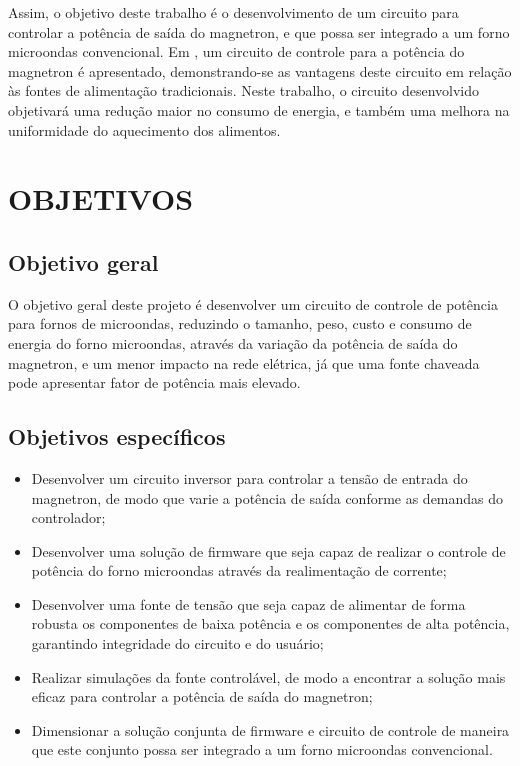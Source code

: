  Assim, o objetivo deste trabalho é o desenvolvimento de um circuito para controlar a potência de saída do magnetron, e que possa ser integrado a um forno microondas convencional. Em \cite{Hidenori1991}, um circuito de controle para a potência do magnetron é apresentado, demonstrando-se as vantagens deste circuito em relação às fontes de alimentação tradicionais. Neste trabalho, o circuito desenvolvido objetivará uma redução maior no consumo de energia, e também uma melhora na uniformidade do aquecimento dos alimentos.


\section{OBJETIVOS}
\label{sec:objetivos}


\subsection{Objetivo geral}
\label{sec:objetivosGerais}

O objetivo geral deste projeto é desenvolver um circuito de controle de potência para fornos de microondas, reduzindo o tamanho, peso, custo e consumo de energia do forno microondas, através da variação da potência de saída do magnetron, e um menor impacto na rede elétrica, já que uma fonte chaveada pode apresentar fator de potência mais elevado.

\subsection{Objetivos específicos}
\label{sec:objetivosEspecificos}

\begin{itemize}
    \item Desenvolver um circuito inversor para controlar a tensão de entrada do magnetron, de modo que varie a potência de saída conforme as demandas do controlador;
    \item Desenvolver uma solução de firmware que seja capaz de realizar o controle de potência do forno microondas através da realimentação de corrente;
    \item Desenvolver uma fonte de tensão que seja capaz de alimentar de forma robusta os componentes de baixa potência e os componentes de alta potência, garantindo integridade do circuito e do usuário;
    \item Realizar simulações da fonte controlável, de modo a encontrar a solução mais eficaz para controlar a potência de saída do magnetron;
    \item Dimensionar a solução conjunta de firmware e circuito de controle de maneira que este conjunto possa ser integrado a um forno microondas convencional.
\end{itemize}


